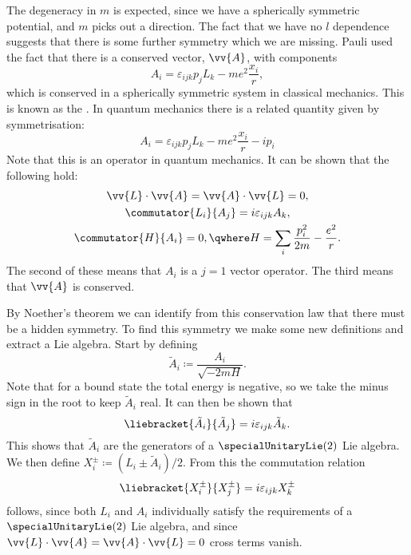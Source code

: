 \documentclass[fleqn]{NotesClass}
\begin{document}
    The degeneracy in \(m\) is expected, since we have a spherically symmetric potential, and \(m\) picks out a direction.
    The fact that we have no \(l\) dependence suggests that there is some further symmetry which we are missing.
    Pauli used the fact that there is a conserved vector, \(\vv{A}\), with components
    \begin{equation}
        A_i = \varepsilon_{ijk}p_jL_k - me^2\frac{x_i}{r},
    \end{equation}
    which is conserved in a spherically symmetric system in classical mechanics.
    This is known as the .
    In quantum mechanics there is a related quantity given by symmetrisation:
    \begin{equation}
        A_i = \varepsilon_{ijk}p_jL_k - me^2\frac{x_i}{r} - ip_i
    \end{equation}
    Note that this is an operator in quantum mechanics.
    It can be shown that the following hold:
    \begin{gather}
        \vv{L} \cdot \vv{A} = \vv{A} \cdot \vv{L} = 0,\\
        \commutator{L_i}{A_j} = i\varepsilon_{ijk}A_k,\\
        \commutator{H}{A_i} = 0, \qwhere H = \sum_i\frac{p_i^2}{2m} - \frac{e^2}{r}.
    \end{gather}
    The second of these means that \(A_i\) is a \(j = 1\) vector operator.
    The third means that \(\vv{A}\) is conserved.
    
    By Noether's theorem we can identify from this conservation law that there must be a hidden symmetry.
    To find this symmetry we make some new definitions and extract a Lie algebra.
    Start by defining
    \begin{equation}
        \tilde{A}_i \coloneqq \frac{A_i}{\sqrt{-2mH}}.
    \end{equation}
    Note that for a bound state the total energy is negative, so we take the minus sign in the root to keep \(\tilde{A}_i\) real.
    It can then be shown that
    \begin{equation}
        \liebracket{\tilde{A}_i}{\tilde{A}_j} = i\varepsilon_{ijk}\tilde{A}_k.
    \end{equation}
    This shows that \(\tilde{A}_i\) are the generators of a \(\specialUnitaryLie(2)\) Lie algebra.
    We then define \(X_i^{\pm} \coloneqq (L_i \pm \tilde{A}_i) / 2\).
    From this the commutation relation
    \begin{equation}
        \liebracket{X_i^{\pm}}{X_j^{\pm}} = i\varepsilon_{ijk}X_k^{\pm}
    \end{equation}
    follows, since both \(L_i\) and \(A_i\) individually satisfy the requirements of a \(\specialUnitaryLie(2)\) Lie algebra, and since \(\vv{L} \cdot \vv{A} = \vv{A} \cdot \vv{L} = 0\) cross terms vanish.
    
\end{document}

